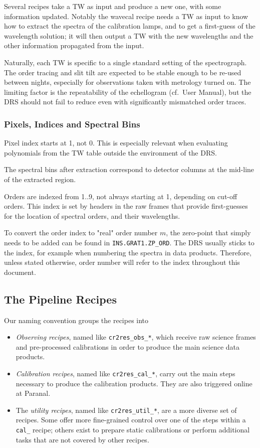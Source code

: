 Several recipes take a TW as input and produce a new one, with some information
updated. Notably the wavecal recipe needs a TW as input to know how to extract
the spectra of the calibration lamps, and to get a first-guess of the
wavelength solution; it will then output a TW with the new wavelengths and
the other information propagated from the input.

Naturally, each TW is specific to a single standard setting of the spectrograph.
The order tracing and slit tilt are expected to be stable enough to be re-used
between nights, especially for observations taken with metrology turned on. The
limiting factor is the repeatability of the echellogram (cf.~User Manual), but
the DRS should not fail to reduce even with significantly mismatched order
traces.

\subsubsection{Pixels, Indices and Spectral Bins}
Pixel index starts at 1, not 0. This is especially relevant when evaluating
polynomials from the TW table outside the environment of the DRS.

The spectral bins after extraction correspond to detector columns at the
mid-line of the extracted region.

Orders are indexed from 1..9, not always starting at 1, depending on cut-off
orders. This index is set by headers in the raw frames that provide first-guesses
for the location of spectral orders, and their wavelengths.

To convert the order index to "real" order number $m$, the zero-point that
simply needs to be added can be found in \texttt{INS.GRAT1.ZP\_ORD}. The DRS
usually sticks to the index, for example when numbering the spectra in data
products. Therefore, unless stated otherwise, order number will refer to the
index throughout this document.

\subsection{The Pipeline Recipes}
\label{sec:recipes-quick}

Our naming convention groups the recipes into
\begin{itemize}
    \item \textit{Observing recipes}, named like \texttt{cr2res\_obs\_*}, which
    receive raw science frames and pre-processed calibrations in order to
    produce the main science data products.
    \item \textit{Calibration recipes}, named like \texttt{cr2res\_cal\_*},
    carry out the main steps necessary to produce the calibration products. They
    are also triggered online at Paranal.
    \item The \textit{utility recipes}, named like \texttt{cr2res\_util\_*}, are
    a more diverse set of recipes. Some offer more fine-grained control over one
    of the steps within a \texttt{cal\_} recipe; others exist to prepare static
    calibrations or perform additional tasks that are not covered by other
    recipes.
\end{itemize}

